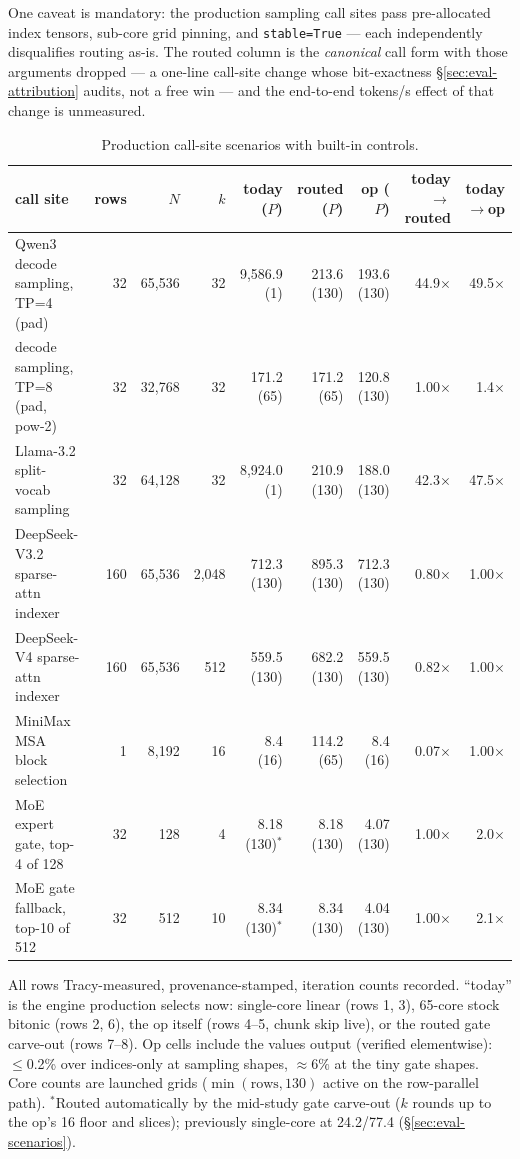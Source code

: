 One caveat is mandatory: the production sampling call sites pass
pre-allocated index tensors, sub-core grid pinning, and
\texttt{stable=True} --- each independently disqualifies routing as-is.
The routed column is the \emph{canonical} call form with
those arguments dropped --- a one-line call-site change whose
bit-exactness \S\ref{sec:eval-attribution} audits, not a free win ---
and the end-to-end tokens/s effect of that change is unmeasured.

\begin{table}[t]
\centering
\caption{Production call-site scenarios with built-in controls.}
\label{tab:scenarios}
\scriptsize
\setlength{\tabcolsep}{4.5pt}
\begin{tabular}{@{}lrrrrrrrr@{}}
\toprule
call site & rows & $N$ & $k$ & today \us{} ($P$) & routed \us{} ($P$) & op \us{} ($P$) & today$\to$routed & today$\to$op \\
\midrule
Qwen3 decode sampling, TP=4 (pad) & 32 & 65,536 & 32 & 9,586.9 (1) & 213.6 (130) & 193.6 (130) & 44.9$\times$ & 49.5$\times$ \\
decode sampling, TP=8 (pad, pow-2) & 32 & 32,768 & 32 & 171.2 (65) & 171.2 (65) & 120.8 (130) & 1.00$\times$ & 1.4$\times$ \\
Llama-3.2 split-vocab sampling & 32 & 64,128 & 32 & 8,924.0 (1) & 210.9 (130) & 188.0 (130) & 42.3$\times$ & 47.5$\times$ \\
DeepSeek-V3.2 sparse-attn indexer & 160 & 65,536 & 2,048 & 712.3 (130) & 895.3 (130) & 712.3 (130) & 0.80$\times$ & 1.00$\times$ \\
DeepSeek-V4 sparse-attn indexer & 160 & 65,536 & 512 & 559.5 (130) & 682.2 (130) & 559.5 (130) & 0.82$\times$ & 1.00$\times$ \\
MiniMax MSA block selection & 1 & 8,192 & 16 & 8.4 (16) & 114.2 (65) & 8.4 (16) & 0.07$\times$ & 1.00$\times$ \\
MoE expert gate, top-4 of 128 & 32 & 128 & 4 & 8.18 (130)$^{*}$ & 8.18 (130) & 4.07 (130) & 1.00$\times$ & 2.0$\times$ \\
MoE gate fallback, top-10 of 512 & 32 & 512 & 10 & 8.34 (130)$^{*}$ & 8.34 (130) & 4.04 (130) & 1.00$\times$ & 2.1$\times$ \\
\bottomrule
\end{tabular}

\smallskip
\raggedright\scriptsize
All rows Tracy-measured, provenance-stamped, iteration counts recorded.
``today'' is the engine production selects now: single-core linear
(rows 1, 3), 65-core stock bitonic (rows 2, 6), the op itself
(rows 4--5, chunk skip live), or the routed gate carve-out (rows 7--8).
Op cells include the values output
(verified elementwise): $\leq$0.2\% over indices-only at sampling
shapes, ${\approx}6\%$ at the tiny gate shapes. Core counts are launched
grids ($\min(\text{rows}, 130)$ active on the row-parallel path).
$^{*}$Routed automatically by the mid-study gate carve-out ($k$ rounds
up to the op's 16 floor and slices); previously single-core at
24.2/77.4\us{} (\S\ref{sec:eval-scenarios}).
\end{table}

